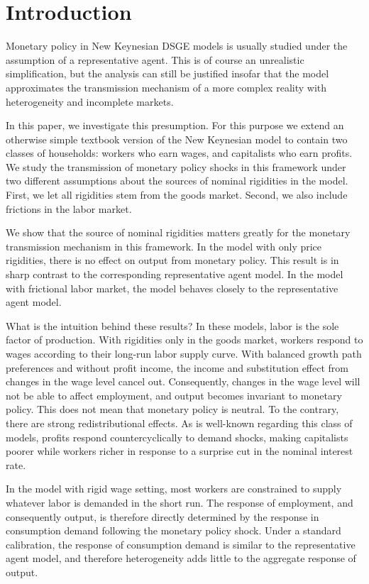 \section{Introduction}

Monetary policy in New Keynesian DSGE models is usually studied under the assumption of a representative agent. This is of course an unrealistic simplification, but the analysis can still be justified insofar that the model approximates the transmission mechanism of a more complex reality with heterogeneity and incomplete markets. 

In this paper, we investigate this presumption. For this purpose we extend an otherwise simple textbook version of the New Keynesian model to contain two classes of households: workers who earn wages, and capitalists who earn profits. We study the transmission of monetary policy shocks in this framework under two different assumptions about the sources of nominal rigidities in the model. First, we let all rigidities stem from the goods market. Second, we also include frictions in the labor market. 

We show that the source of nominal rigidities matters greatly for the monetary transmission mechanism in this framework. In the model with only price rigidities, there is no effect on output from monetary policy. This result is in sharp contrast to the corresponding representative agent model. In the model with frictional labor market, the model behaves closely to the representative agent model.

What is the intuition behind these results? In these models, labor is the sole factor of production. With rigidities only in the goods market, workers respond to wages according to their long-run labor supply curve. With balanced growth path preferences and without profit income, the income and substitution effect from changes in the wage level cancel out. Consequently, changes in the wage level will not be able to affect employment, and output becomes invariant to monetary policy. This does not mean that monetary policy is neutral. To the contrary, there are strong redistributional effects. As is well-known regarding this class of models, profits respond countercyclically to demand shocks, making capitalists poorer while workers richer in response to a surprise cut in the nominal interest rate.

In the model with rigid wage setting, most workers are constrained to supply whatever labor is demanded in the short run. The response of employment, and consequently output, is therefore directly determined by the response in consumption demand following the monetary policy shock. Under a standard calibration, the response of consumption demand is similar to the representative agent model, and therefore heterogeneity adds little to the aggregate response of output.   

